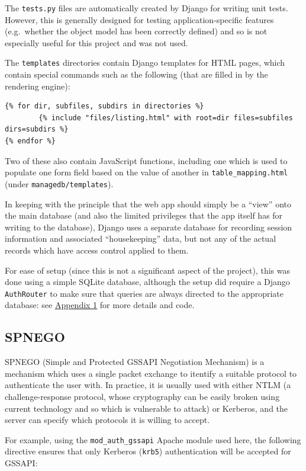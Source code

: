 \documentclass{article}
\begin{document}
The \texttt{tests.py} files are automatically created by Django for writing unit tests. However, this is generally designed for testing application-specific features (e.g.\ whether the object model has been correctly defined) and so is not especially useful for this project and was not used.

The \texttt{templates} directories contain Django templates for HTML pages, which contain special commands such as the following (that are filled in by the rendering engine):

\begin{verbatim}
{% for dir, subfiles, subdirs in directories %}
        {% include "files/listing.html" with root=dir files=subfiles dirs=subdirs %}
{% endfor %}
\end{verbatim}

Two of these also contain JavaScript functions, including one which is used to populate one form field based on the value of another in \verb+table_mapping.html+ (under \texttt{managedb/templates}).

In keeping with the principle that the web app should simply be a ``view'' onto the main database (and also the limited privileges that the app itself has for writing to the database), Django uses a separate database for recording session information and associated ``housekeeping'' data, but not any of the actual records which have access control applied to them.

For ease of setup (since this is not a significant aspect of the project), this was done using a simple SQLite database, although the setup did require a Django \texttt{AuthRouter} to make sure that queries are always directed to the appropriate database: see \hyperref[sec:appendix1]{Appendix 1} for more details and code.

\subsection{SPNEGO}
SPNEGO (Simple and Protected GSSAPI Negotiation Mechanism) is a mechanism which uses a single packet exchange to itentify a suitable protocol to authenticate the user with. In practice, it is usually used with either NTLM (a challenge-response protocol, whose cryptography can be easily broken using current technology and so which is vulnerable to attack) or Kerberos, and the server can specify which protocols it is willing to accept.

For example, using the \verb+mod_auth_gssapi+ Apache module used here, the following directive ensures that only Kerberos (\texttt{krb5}) authentication will be accepted for GSSAPI:
\end{document}
